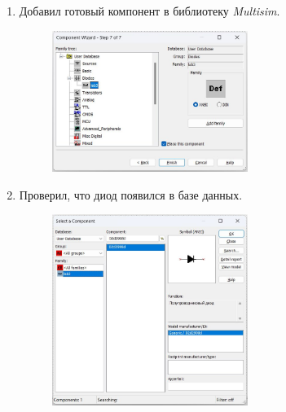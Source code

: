 \begin{enumerate}
\begin{figure}[H]
	\end{figure}
	\newpage
	\item Добавил готовый компонент в библиотеку \textit{Multisim}.
	\begin{figure}[H]
		\centering
		\includegraphics[width=0.6\textwidth]{img/09.jpg}
	\end{figure}
	\item Проверил, что диод появился в базе данных.
	\begin{figure}[H]
		\centering
		\includegraphics[width=0.6\textwidth]{img/10.jpg}
	\end{figure}
\end{enumerate}
